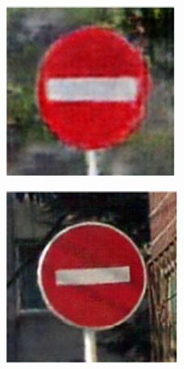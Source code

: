 \begin{figure}[h]
    \centering
    \captionsetup[subfigure]{labelformat=empty}
    \begin{subfigure}{0.125\textwidth}
        \centering
        \includegraphics[height=\textwidth]{../images/Taiwan Schilder/Generated0.png}
    \end{subfigure}
    \hspace{2em}%
    \begin{subfigure}{0.125\textwidth}
        \centering
        \includegraphics[height=\textwidth]{../images/Taiwan Schilder/Generated1.png}

\end{subfigure}
\end{figure}
